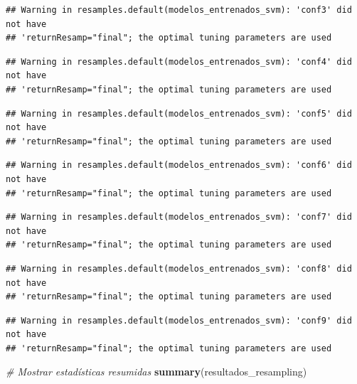 \documentclass[
]{article}
\newenvironment{Shaded}{\begin{snugshade}}{\end{snugshade}}
\newcommand{\CommentTok}[1]{\textcolor[rgb]{0.56,0.35,0.01}{\textit{#1}}}
\newcommand{\FunctionTok}[1]{\textcolor[rgb]{0.13,0.29,0.53}{\textbf{#1}}}
\newcommand{\NormalTok}[1]{#1}
\begin{document}
\begin{verbatim}
## Warning in resamples.default(modelos_entrenados_svm): 'conf3' did not have
## 'returnResamp="final"; the optimal tuning parameters are used
\end{verbatim}

\begin{verbatim}
## Warning in resamples.default(modelos_entrenados_svm): 'conf4' did not have
## 'returnResamp="final"; the optimal tuning parameters are used
\end{verbatim}

\begin{verbatim}
## Warning in resamples.default(modelos_entrenados_svm): 'conf5' did not have
## 'returnResamp="final"; the optimal tuning parameters are used
\end{verbatim}

\begin{verbatim}
## Warning in resamples.default(modelos_entrenados_svm): 'conf6' did not have
## 'returnResamp="final"; the optimal tuning parameters are used
\end{verbatim}

\begin{verbatim}
## Warning in resamples.default(modelos_entrenados_svm): 'conf7' did not have
## 'returnResamp="final"; the optimal tuning parameters are used
\end{verbatim}

\begin{verbatim}
## Warning in resamples.default(modelos_entrenados_svm): 'conf8' did not have
## 'returnResamp="final"; the optimal tuning parameters are used
\end{verbatim}

\begin{verbatim}
## Warning in resamples.default(modelos_entrenados_svm): 'conf9' did not have
## 'returnResamp="final"; the optimal tuning parameters are used
\end{verbatim}

\begin{Shaded}
\begin{Highlighting}[]
\CommentTok{\# Mostrar estadísticas resumidas}
\FunctionTok{summary}\NormalTok{(resultados\_resampling)}
\end{Highlighting}
\end{Shaded}
\end{document}
